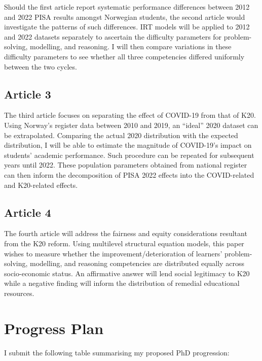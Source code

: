 \documentclass[
    a4paper,                %
    11pt,                   %
    stu,                    %
    donotrepeattitle,       %
    floatsintext,           %
    biblatex,               %
    colorlinks=true,        %
    linkcolor=red,          %
    anchorcolor=black,      %
    citecolor=blue,         %
    urlcolor=blue,          %
    bookmarks=true,         %
    bookmarksopen=false,    %
    bookmarksnumbered=true, %
    dvipsnames              %
]{apa7}
\begin{document}
Should the first article report systematic performance differences between 2012 and 2022 PISA results amongst Norwegian students, the second article would investigate the patterns of such differences. IRT models will be applied to 2012 and 2022 datasets separately to ascertain the difficulty parameters for problem-solving, modelling, and reasoning. I will then compare variations in these difficulty parameters to see whether all three competencies differed uniformly between the two cycles.

\subsection{Article 3}

The third article focuses on separating the effect of COVID-19 from that of K20. Using Norway's register data between 2010 and 2019, an ``ideal'' 2020 dataset can be extrapolated. Comparing the actual 2020 distribution with the expected distribution, I will be able to estimate the magnitude of COVID-19's impact on students' academic performance. Such procedure can be repeated for subsequent years until 2022. These population parameters obtained from national register can then inform the decomposition of PISA 2022 effects into the COVID-related and K20-related effects.

\subsection{Article 4}

The fourth article will address the fairness and equity considerations resultant from the K20 reform. Using multilevel structural equation models, this paper wishes to measure whether the improvement/deterioration of learners' problem-solving, modelling, and reasoning competencies are distributed equally across socio-economic status. An affirmative answer will lend social legitimacy to K20 while a negative finding will inform the distribution of remedial educational resources.

\section{Progress Plan}

I submit the following table summarising my proposed PhD progression:
\end{document}
